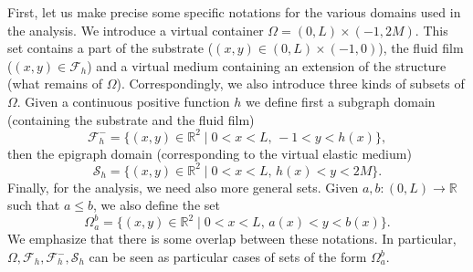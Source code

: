\documentclass[11pt]{article}
\let\mathcal\mathscr
\theoremstyle{remark}
\theoremstyle{definition}
\newcommand{\Real}{\mathbb{R}}
\let\CM\Omega
\begin{document}
First, let us make precise some specific notations for the various domains used in the analysis. We introduce a virtual container $\Omega = (0,L) \times (-1,2M)$. This set contains a part of the substrate ($(x,y) \in (0,L) \times (-1,0)$), the fluid film
($(x,y) \in \mathcal F_h$) and a virtual medium containing an extension of the structure (what remains of $\Omega$).
Correspondingly, we also introduce three kinds of subsets of $\Omega$. Given a continuous positive function $h$ we define first a subgraph domain (containing the substrate and the fluid film)
\[\mathcal{F}^-_{h}=\{(x,y)\in\Real^{2}\mid 0<x<L,\,-1<y<h(x)\},\]
then the epigraph domain (corresponding to the virtual elastic medium)
\[\mathcal{S}_{h}=\{(x,y)\in\Real^{2}\mid 0<x<L,\,h(x)<y<2M\}.\]
Finally, for the analysis, we need also more general sets. Given $a,b:(0,L)\to \Real$ such that $a \leq b$,
we also define the set
\[\Omega_{a}^{b}=\{(x,y)\in\Real^{2}\mid 0<x<L,\,a(x)<y<b(x)\}.\]
We emphasize that there is some overlap between these notations.
In particular, $\CM, \mathcal{F}_{h}, \mathcal{F}^-_{h}, \mathcal{S}_{h}$ can be seen as particular cases of sets of the form $\Omega_{a}^{b}$.
\end{document}
